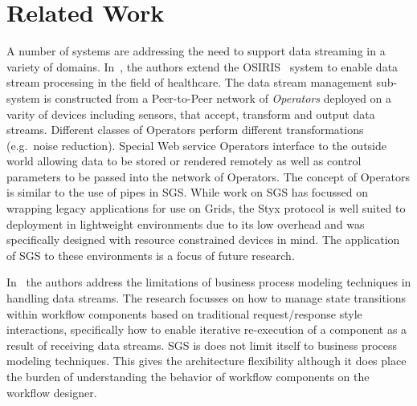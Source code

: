 \documentclass[a4paper]{article}
\begin{document}
\section{Related Work}%

A number of systems are addressing the need to support data streaming in a variety of domains. In~\cite{brettlecker:2004}, the authors extend the OSIRIS~\cite{schuler:2003} system to enable data stream processing in the field of healthcare. The data stream management sub-system is constructed from a Peer-to-Peer network of \emph{Operators} deployed on a varity of devices including sensors, that accept, transform and output data streams. Different classes of Operators perform different transformations (e.g.\ noise reduction). Special Web service Operators interface to the outside world allowing data to be stored or rendered remotely as well as control parameters to be passed into the network of Operators. The concept of Operators is similar to the use of pipes in SGS. While work on SGS has focussed on wrapping legacy applications for use on Grids, the Styx protocol is well suited to deployment in lightweight environments due to its low overhead and was specifically designed with resource constrained devices in mind. The application of SGS to these environments is a focus of future research.

In~\cite{bioernstad:2006} the authors address the limitations of business process modeling techniques in handling data streams. The research focusses on how to manage state transitions within workflow components based on traditional request/response style interactions, specifically how to enable iterative re-execution of a component as a result of receiving data streams. SGS is does not limit itself to business process modeling techniques. This gives the architecture flexibility although it does place the burden of understanding the behavior of workflow components on the workflow designer.
\end{document}
